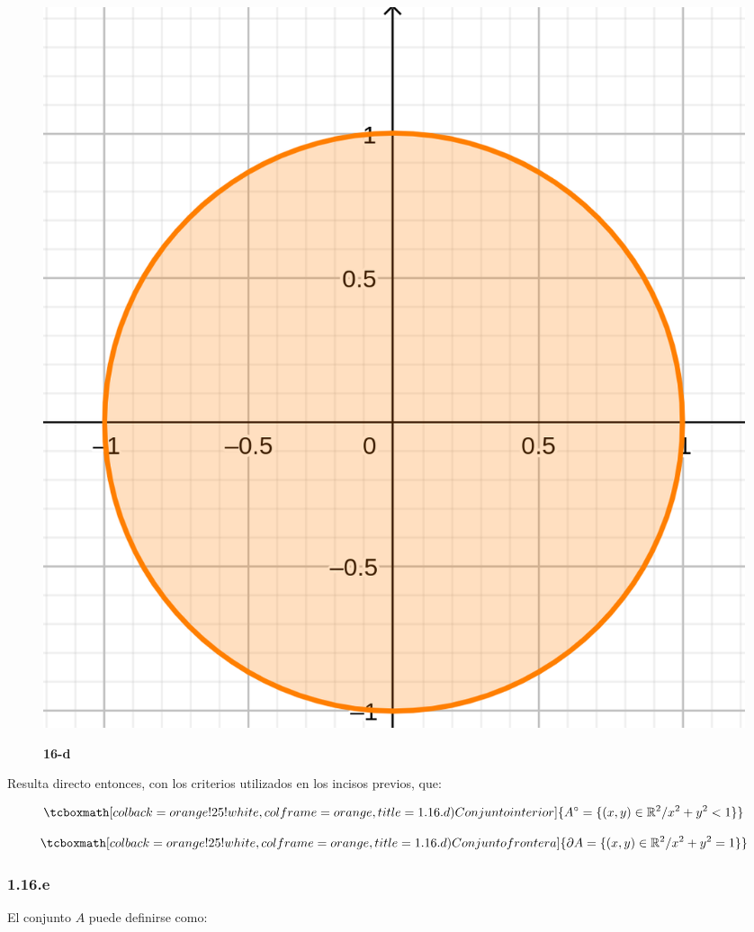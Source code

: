 \documentclass{article}
\renewcommand{\Bbb}{\mathbb}
\begin{document}
\begin{figure}[ht]
\caption{\textbf{16-d}}
\includegraphics[scale=2.5]{img/ejercicios/1/16-d.png} 
\centering
\label{fig:1-16-d}
\end{figure}

Resulta directo entonces, con los criterios utilizados en los incisos previos, que:

\begin{equation}
\tcboxmath[colback=orange!25!white,colframe=orange, title=1.16.d) Conjunto interior]
{ A^{\circ} = \{ (x, y) \in \Bbb R^2 / x^2 + y^2 < 1 \}  }
\end{equation}

\begin{equation}
\tcboxmath[colback=orange!25!white,colframe=orange, title=1.16.d) Conjunto frontera]
{ \partial{A} = \{ (x, y) \in \Bbb R^2 / x^2 + y^2 = 1 \} }
\end{equation}

\subsubsection*{1.16.e}
\label{subsubsec:1.16.e}

El conjunto $A$ puede definirse como:
\end{document}
